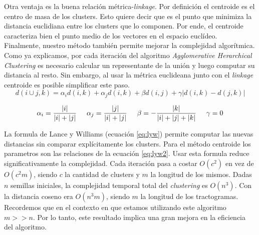 Otra ventaja es la buena relaci\'on m\'etrica-\textit{linkage}. Por definici\'on
el centroide es el centro de masa de los clusters. Esto quiere decir que es el 
punto que minimiza la distancia euclidiana entre los clusters que lo componen. 
Por ende, el centroide caracteriza bien el punto medio de los vectores en el
espacio eucl\'ideo. \\

Finalmente, nuestro m\'etodo tambi\'en permite mejorar la complejidad algor\'itmica.
Como ya explicamos, por cada iteraci\'on del algoritmo 
\textit{Agglomerative Herarchical Clustering} es necesario calcular un representante
de la uni\'on y luego computar su distancia al resto. Sin embargo, al usar la
m\'etrica euclideana junto con el \textit{linkage} centroide es posible simplificar
este paso. \\

\begin{equation}
\label{eq:lyw}
d(i \cup j,k) = \alpha_i d(i,k) + \alpha_j d(i,k) + \beta d(i,j) + \gamma | d(i,k) - d(j,k) |
\end{equation}

\begin{equation}
\label{eq:lyw2}
\alpha_i = \frac{|i|}{|i|+|j|} \hspace{0.5cm}
\alpha_j = \frac{|j|}{|i|+|j|} \hspace{0.5cm}
\beta = -\frac{|k|}{|i|+|j|+|k|} \hspace{0.5cm}
\gamma = 0
\end{equation}

\hspace{0.5cm}

La formula de Lance y Williams (ecuaci\'on \ref{eq:lyw}) permite computar
las nuevas distancias sin comparar expl\'icitamente los clusters. Para el m\'etodo
centroide los parametros son las relaciones de la ecuaci\'on \ref{eq:lyw2}. Usar esta formula reduce
significativamente la complejidad. Cada iteraci\'on pasa a costar $O(c^2)$ en 
vez de $O(c^2 m)$, siendo $c$ la cantidad de clusters y $m$ la longitud de los
mismos. Dadas $n$ semillas iniciales, la complejidad temporal total del
\textit{clustering} es $O(n^3)$.  Con la distancia coseno era $O(n^3 m)$, siendo
$m$ la longitud de los tractogramas. Recordemos que en el contexto en que estamos
 utilizando este algoritmo $m>>n$. Por
lo tanto, este resultado implica una gran mejora en la eficiencia del algoritmo.  
